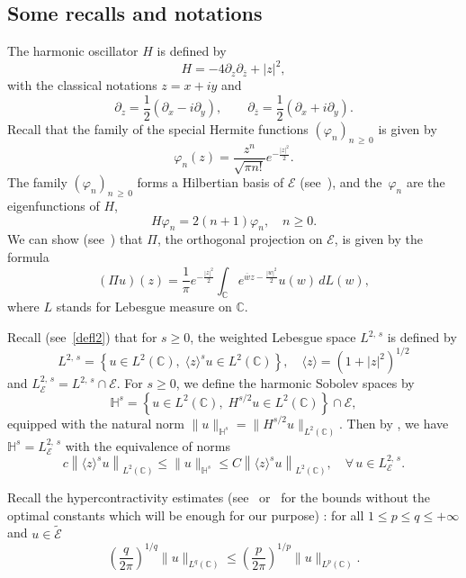 \documentclass[AHL,Unicode,published]{cedram}
\newcommand{\C}{\mathbb{C}}
\newcommand{\HH}{\mathbb{H}}
\newcommand{\E}{\mathcal{E}}
\newcommand{\ov}{\overline}
\newcommand{\wt}{\widetilde}
\newcommand{\<}{\langle}
\renewcommand{\>}{\rangle}
\renewcommand{\phi}{\varphi}
\let\oldforall\forall
\renewcommand*{\forall}{\mathrel{\oldforall}}
\begin{document}
\subsection{Some recalls and notations}

The harmonic oscillator $H$ is defined by
\[
H = -4\partial_z \partial_{\ov z}+|z|^2,
\]
with the classical notations $z=x+iy$ and
\[
\partial_z=\frac12\left(\partial_x-i\partial_y\right), \qquad \partial_{\ov{z}}=\frac12\left(\partial_x+i\partial_y\right).
\]
Recall that the family of the special Hermite functions $(\phi_n)_{n\,\geq\,0}$ is given by
\[
\varphi_n(z) = \frac{z^n}{\sqrt{\pi n!}} e^{-\frac{|z|^2}{2}}.
\]
The family $(\phi_n)_{n\,\geq\,0}$ forms a Hilbertian basis of $\E$ (see~\cite[Proposition~2.1]{Zhu}), and the~$\phi_n$ are the eigenfunctions of $H$,
\[
H\phi_n=2(n+1)\phi_n, \quad n\geq 0.
\]
We can show (see~\cite{GGT}) that $\Pi$, the orthogonal projection on $\E$, is given by the formula
\begin{equation}\label{ker-pi}
(\Pi u)(z) = \frac{1}{\pi} e^{-\frac{|z|^2}{2}} \int_\C e^{\ov w z - \frac{|w|^2}{2}} u(w) \,dL(w),
\end{equation}
where $L$ stands for Lebesgue measure on $\C$.

Recall (see~\eqref{defl2}) that for $s\geq 0$, the weighted Lebesgue space $L^{2,\,s}$ is defined by
\[
L^{2,\,s}=\left\{u\in L^2(\C), \;\<z\>^su \in L^2(\C)\right\}, \quad \<z\>=\left(1+|z|^2\right)^{1/2}
\]
and $L^{2,\,s}_{\E}=L^{2,\,s} \cap \E$. For $s \geq 0$, we define the harmonic Sobolev spaces by
\[
\HH^{s} = \left\{ u\in L^2(\C),\; {H}^{s/2}u\in L^2(\C)\right\}\cap \E,
\]
equipped with the natural norm $ \|u\|_{\HH^s} =\|H^{s/2} u\|_{L^2(\C)}$. Then by \cite[Lem\-ma~C.1]{GGT}, we have $\HH^{s} = L^{2,\,s}_{\E}$ with the equivalence of norms
\begin{equation}\label{eqiv-0}
c\left\|\<z\>^s u\right\|_{L^2(\C)} \leq \|u\|_{\HH^s} \leq C\left\|\<z\>^s u\right\|_{L^2(\C)}, \quad \forall\,u \in L^{2,\,s}_{\E}.
\end{equation}

Recall the hypercontractivity estimates (see~\cite{Carlen} or~\cite[Lemma~A.2]{Schw-Tho} for the bounds without the optimal constants which will be enough for our purpose) : for all $1 \leq p \leq q \leq +\infty$ and $u
\in \wt{\E}$
\begin{equation}\label{hyper}
\left(\frac{q}{2\pi} \right)^{1/q} \| u \|_{L^q(\C)} \leq \left(\frac{p}{2\pi} \right)^{1/p} \| u \|_{L^p(\C)}.
\end{equation}
\end{document}
